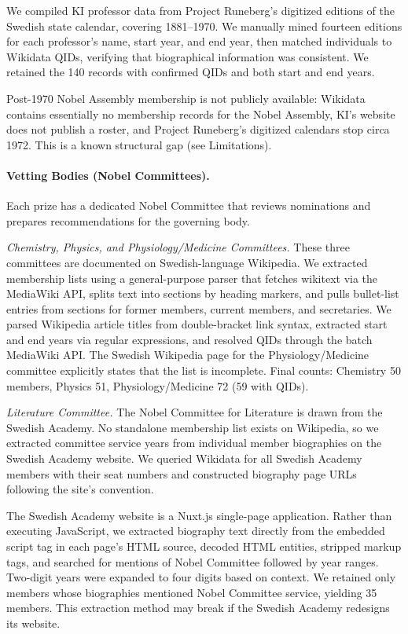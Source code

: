 \documentclass[12pt]{article}
\begin{document}
We compiled KI professor data from Project Runeberg's digitized editions of the Swedish state calendar, covering 1881--1970. We manually mined fourteen editions for each professor's name, start year, and end year, then matched individuals to Wikidata QIDs, verifying that biographical information was consistent. We retained the 140 records with confirmed QIDs and both start and end years.

Post-1970 Nobel Assembly membership is not publicly available: Wikidata contains essentially no membership records for the Nobel Assembly, KI's website does not publish a roster, and Project Runeberg's digitized calendars stop circa 1972. This is a known structural gap (see Limitations).

\paragraph*{Vetting Bodies (Nobel Committees).}

Each prize has a dedicated Nobel Committee that reviews nominations and prepares recommendations for the governing body.

\emph{Chemistry, Physics, and Physiology/Medicine Committees.} These three committees are documented on Swedish-language Wikipedia. We extracted membership lists using a general-purpose parser that fetches wikitext via the MediaWiki API, splits text into sections by heading markers, and pulls bullet-list entries from sections for former members, current members, and secretaries. We parsed Wikipedia article titles from double-bracket link syntax, extracted start and end years via regular expressions, and resolved QIDs through the batch MediaWiki API. The Swedish Wikipedia page for the Physiology/Medicine committee explicitly states that the list is incomplete. Final counts: Chemistry 50 members, Physics 51, Physiology/Medicine 72 (59 with QIDs).

\emph{Literature Committee.} The Nobel Committee for Literature is drawn from the Swedish Academy. No standalone membership list exists on Wikipedia, so we extracted committee service years from individual member biographies on the Swedish Academy website. We queried Wikidata for all Swedish Academy members with their seat numbers and constructed biography page URLs following the site's convention.

The Swedish Academy website is a Nuxt.js single-page application. Rather than executing JavaScript, we extracted biography text directly from the embedded script tag in each page's HTML source, decoded HTML entities, stripped markup tags, and searched for mentions of Nobel Committee followed by year ranges. Two-digit years were expanded to four digits based on context. We retained only members whose biographies mentioned Nobel Committee service, yielding 35 members. This extraction method may break if the Swedish Academy redesigns its website.
\end{document}
